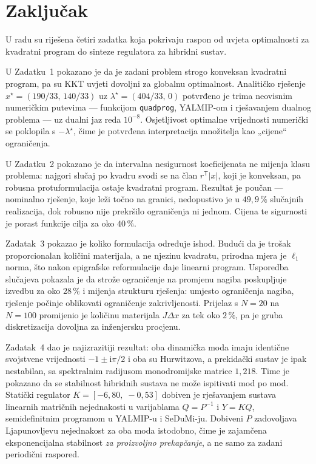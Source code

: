 
\section{Zaključak}
\label{sec:zakljucak}

U radu su riješena četiri zadatka koja pokrivaju raspon od uvjeta optimalnosti
za kvadratni program do sinteze regulatora za hibridni sustav.

U Zadatku~1 pokazano je da je zadani problem strogo konveksan kvadratni program,
pa su KKT uvjeti dovoljni za globalnu optimalnost. Analitičko rješenje
$x^\star = (190/33,\, 140/33)$ uz $\lambda^\star = (404/33,\, 0)$ potvrđeno je
trima neovisnim numeričkim putevima --- funkcijom \texttt{quadprog}, YALMIP-om i
rješavanjem dualnog problema --- uz dualni jaz reda $10^{-8}$. Osjetljivost
optimalne vrijednosti numerički se poklopila s $-\lambda^\star$, čime je
potvrđena interpretacija množitelja kao „cijene“ ograničenja.

U Zadatku~2 pokazano je da intervalna nesigurnost koeficijenata ne mijenja klasu
problema: najgori slučaj po kvadru svodi se na član $r^{\mathsf T}|x|$, koji je
konveksan, pa robusna protuformulacija ostaje kvadratni program. Rezultat je
poučan --- nominalno rješenje, koje leži točno na granici, nedopustivo je u
$49{,}9\,\%$ slučajnih realizacija, dok robusno nije prekršilo ograničenja ni
jednom. Cijena te sigurnosti je porast funkcije cilja za oko $40\,\%$.

Zadatak~3 pokazao je koliko formulacija određuje ishod. Budući da je trošak
proporcionalan količini materijala, a ne njezinu kvadratu, prirodna mjera je
$\ell_1$ norma, što nakon epigrafske reformulacije daje linearni program.
Usporedba slučajeva pokazala je da strože ograničenje na promjenu nagiba
poskupljuje izvedbu za oko $28\,\%$ i mijenja strukturu rješenja: umjesto
ograničenja nagiba, rješenje počinje oblikovati ograničenje zakrivljenosti.
Prijelaz s $N = 20$ na $N = 100$ promijenio je količinu materijala $J\Delta x$ za
tek oko $2\,\%$, pa je gruba diskretizacija dovoljna za inženjersku procjenu.

Zadatak~4 dao je najizrazitiji rezultat: oba dinamička moda imaju identične
svojstvene vrijednosti $-1 \pm \mathrm{i}\pi/2$ i oba su Hurwitzova, a prekidački
sustav je ipak nestabilan, sa spektralnim radijusom monodromijske matrice
$1{,}218$. Time je pokazano da se stabilnost hibridnih sustava ne može ispitivati
mod po mod. Statički regulator $K = [-6{,}80,\; -0{,}53]$ dobiven je rješavanjem
sustava linearnih matričnih nejednakosti u varijablama $Q = P^{-1}$ i $Y = KQ$,
semidefinitnim programom u YALMIP-u i SeDuMi-ju. Dobiveni $P$ zadovoljava
Ljapunovljevu nejednakost za oba moda istodobno, čime je zajamčena eksponencijalna
stabilnost \emph{za proizvoljno prekapčanje}, a ne samo za zadani periodični
raspored.

